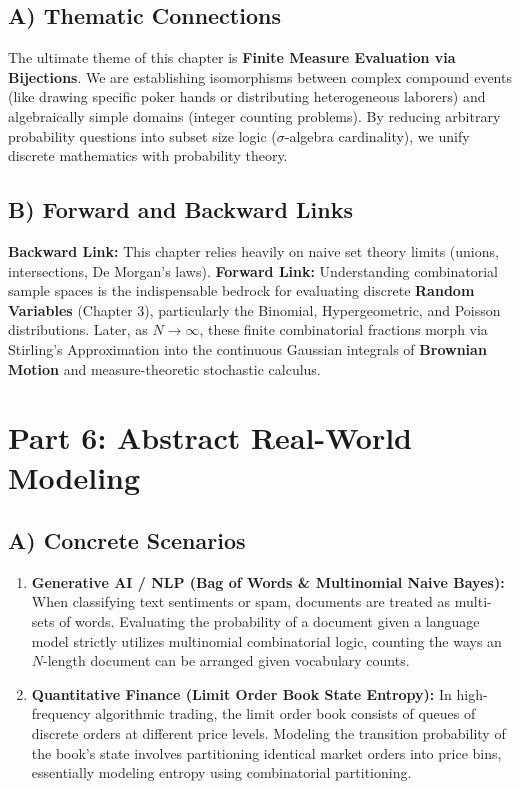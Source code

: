 \documentclass[11pt]{article}
\theoremstyle{definition}
\theoremstyle{plain}
\theoremstyle{remark}
\begin{document}
\subsection{A) Thematic Connections}
The ultimate theme of this chapter is \textbf{Finite Measure Evaluation via Bijections}. We are establishing isomorphisms between complex compound events (like drawing specific poker hands or distributing heterogeneous laborers) and algebraically simple domains (integer counting problems). By reducing arbitrary probability questions into subset size logic ($\sigma$-algebra cardinality), we unify discrete mathematics with probability theory.

\subsection{B) Forward and Backward Links}
\textbf{Backward Link:} This chapter relies heavily on naive set theory limits (unions, intersections, De Morgan's laws). 
\textbf{Forward Link:} Understanding combinatorial sample spaces is the indispensable bedrock for evaluating discrete \textbf{Random Variables} (Chapter 3), particularly the Binomial, Hypergeometric, and Poisson distributions. Later, as $N \to \infty$, these finite combinatorial fractions morph via Stirling's Approximation into the continuous Gaussian integrals of \textbf{Brownian Motion} and measure-theoretic stochastic calculus. 

\section{Part 6: Abstract Real-World Modeling}

\subsection{A) Concrete Scenarios}
\begin{enumerate}
    \item \textbf{Generative AI / NLP (Bag of Words \& Multinomial Naive Bayes):} When classifying text sentiments or spam, documents are treated as multi-sets of words. Evaluating the probability of a document given a language model strictly utilizes multinomial combinatorial logic, counting the ways an $N$-length document can be arranged given vocabulary counts.
    \item \textbf{Quantitative Finance (Limit Order Book State Entropy):} In high-frequency algorithmic trading, the limit order book consists of queues of discrete orders at different price levels. Modeling the transition probability of the book's state involves partitioning identical market orders into price bins, essentially modeling entropy using combinatorial partitioning.
\end{enumerate}
\end{document}

